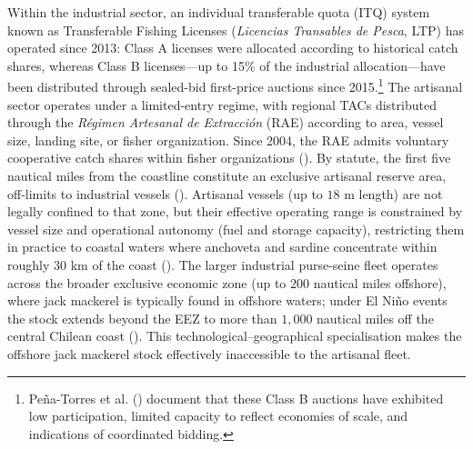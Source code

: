 \documentclass[
  11pt,
]{article}
\begin{document}
Within the industrial sector, an individual transferable quota (ITQ) system known as Transferable Fishing Licenses (\emph{Licencias Transables de Pesca}, LTP) has operated since 2013: Class A licenses were allocated according to historical catch shares, whereas Class B licenses---up to 15\% of the industrial allocation---have been distributed through sealed-bid first-price auctions since 2015.\footnote{Peña-Torres et al. () document that these Class B auctions have exhibited low participation, limited capacity to reflect economies of scale, and indications of coordinated bidding.} The artisanal sector operates under a limited-entry regime, with regional TACs distributed through the \emph{Régimen Artesanal de Extracción} (RAE) according to area, vessel size, landing site, or fisher organization. Since 2004, the RAE admits voluntary cooperative catch shares within fisher organizations (). By statute, the first five nautical miles from the coastline constitute an exclusive artisanal reserve area, off-limits to industrial vessels (). Artisanal vessels (up to \(18\) m length) are not legally confined to that zone, but their effective operating range is constrained by vessel size and operational autonomy (fuel and storage capacity), restricting them in practice to coastal waters where anchoveta and sardine concentrate within roughly \(30\) km of the coast (). The larger industrial purse-seine fleet operates across the broader exclusive economic zone (up to \(200\) nautical miles offshore), where jack mackerel is typically found in offshore waters; under El Niño events the stock extends beyond the EEZ to more than \(1{,}000\) nautical miles off the central Chilean coast (). This technological--geographical specialisation makes the offshore jack mackerel stock effectively inaccessible to the artisanal fleet.
\end{document}
